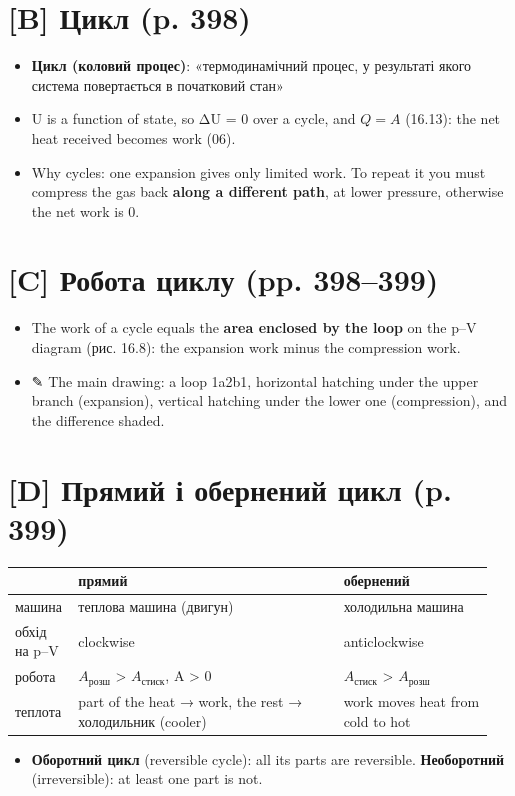 \documentclass[11pt,a4paper,oneside]{book}
\newcommand{\pen}{{\sffamily\color{accent}✎}}
\begin{document}
\section*{[B] Цикл (p. 398)}
\begin{itemize}
\item \textbf{Цикл (коловий процес)}: «термодинамічний процес, у результаті якого система повертається в початковий стан»
\item U is a function of state, so ΔU = 0 over a cycle, and $Q = A$ (16.13): the net heat received becomes work (06).
\item Why cycles: one expansion gives only limited work. To repeat it you must compress the gas back \textbf{along a different path}, at lower pressure, otherwise the net work is 0.
\end{itemize}

\section*{[C] Робота циклу (pp. 398–399)}
\begin{itemize}
\item The work of a cycle equals the \textbf{area enclosed by the loop} on the p–V diagram (рис. 16.8): the expansion work minus the compression work.
\item \pen{} The main drawing: a loop 1a2b1, horizontal hatching under the upper branch (expansion), vertical hatching under the lower one (compression), and the difference shaded.
\end{itemize}

\section*{[D] Прямий і обернений цикл (p. 399)}
{\small
\begin{longtable}{>{\raggedright\arraybackslash}p{0.114\linewidth}>{\raggedright\arraybackslash}p{0.533\linewidth}>{\raggedright\arraybackslash}p{0.305\linewidth}}
\toprule
\textbf{} & \textbf{\textbf{прямий}} & \textbf{\textbf{обернений}} \\
\midrule
\endhead
машина & теплова машина (двигун) & холодильна машина \\
обхід на p–V & clockwise & anticlockwise \\
робота & $A_{\text{розш}}$ > $A_{\text{стиск}}$, A > 0 & $A_{\text{стиск}}$ > $A_{\text{розш}}$ \\
теплота & part of the heat → work, the rest → холодильник (cooler) & work moves heat from cold to hot \\
\bottomrule
\end{longtable}
}
\begin{itemize}
\item \textbf{Оборотний цикл} (reversible cycle): all its parts are reversible. \textbf{Необоротний} (irreversible): at least one part is not.
\end{itemize}
\end{document}
